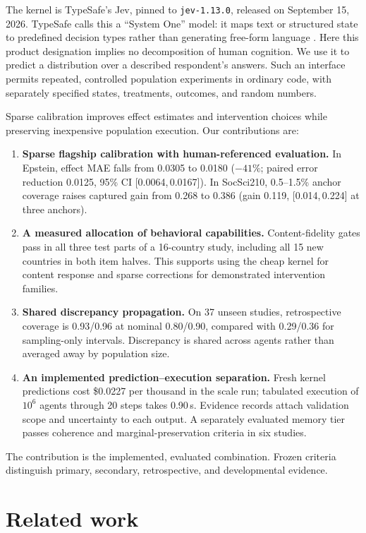 \documentclass[11pt]{article}
\newcommand{\CI}[2]{[#1,\,#2]}
\begin{document}
The kernel is TypeSafe's Jev, pinned to \texttt{jev-1.13.0}, released on September 15, 2026. TypeSafe calls this a ``System One'' model: it maps text or structured state to predefined decision types rather than generating free-form language \citep{typesafe2026}. Here this product designation implies no decomposition of human cognition. We use it to predict a distribution over a described respondent's answers. Such an interface permits repeated, controlled population experiments in ordinary code, with separately specified states, treatments, outcomes, and random numbers.

Sparse calibration improves effect estimates and intervention choices while preserving inexpensive population execution. Our contributions are:
\begin{enumerate}
\item \textbf{Sparse flagship calibration with human-referenced evaluation.} In Epstein, effect MAE falls from 0.0305 to 0.0180 ($-41\%$; paired error reduction 0.0125, 95\% CI \CI{0.0064}{0.0167}). In SocSci210, 0.5--1.5\% anchor coverage raises captured gain from 0.268 to 0.386 (gain 0.119, \CI{0.014}{0.224} at three anchors).
\item \textbf{A measured allocation of behavioral capabilities.} Content-fidelity gates pass in all three test parts of a 16-country study, including all 15 new countries in both item halves. This supports using the cheap kernel for content response and sparse corrections for demonstrated intervention families.
\item \textbf{Shared discrepancy propagation.} On 37 unseen studies, retrospective coverage is 0.93/0.96 at nominal 0.80/0.90, compared with 0.29/0.36 for sampling-only intervals. Discrepancy is shared across agents rather than averaged away by population size.
\item \textbf{An implemented prediction--execution separation.} Fresh kernel predictions cost \$0.0227 per thousand in the scale run; tabulated execution of $10^6$ agents through 20 steps takes 0.90\,s. Evidence records attach validation scope and uncertainty to each output. A separately evaluated memory tier passes coherence and marginal-preservation criteria in six studies.
\end{enumerate}
The contribution is the implemented, evaluated combination. Frozen criteria distinguish primary, secondary, retrospective, and developmental evidence.

\section{Related work}
\end{document}
